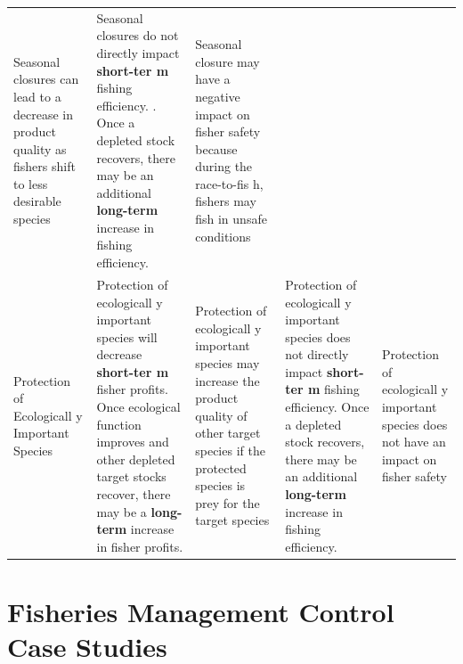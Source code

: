 \documentclass[]{book}
\begin{document}
\begin{longtable}[]{@{}lllll@{}}
\begin{minipage}[t]{0.17\columnwidth}
Seasonal closures can lead to a decrease in product quality as fishers
shift to less desirable species\strut
\end{minipage} & \begin{minipage}[t]{0.17\columnwidth}\raggedright\strut
Seasonal closures do not directly impact \textbf{short-ter m} fishing
efficiency. . Once a depleted stock recovers, there may be an additional
\textbf{long-term } increase in fishing efficiency.\strut
\end{minipage} & \begin{minipage}[t]{0.17\columnwidth}\raggedright\strut
Seasonal closure may have a negative impact on fisher safety because
during the race-to-fis h, fishers may fish in unsafe conditions\strut
\end{minipage}\tabularnewline
\begin{minipage}[t]{0.17\columnwidth}\raggedright\strut
Protection of Ecologicall y Important Species\strut
\end{minipage} & \begin{minipage}[t]{0.17\columnwidth}\raggedright\strut
Protection of ecologicall y important species will decrease
\textbf{short-ter m} fisher profits. Once ecological function improves
and other depleted target stocks recover, there may be a
\textbf{long-term } increase in fisher profits.\strut
\end{minipage} & \begin{minipage}[t]{0.17\columnwidth}\raggedright\strut
Protection of ecologicall y important species may increase the product
quality of other target species if the protected species is prey for the
target species\strut
\end{minipage} & \begin{minipage}[t]{0.17\columnwidth}\raggedright\strut
Protection of ecologicall y important species does not directly impact
\textbf{short-ter m} fishing efficiency. Once a depleted stock recovers,
there may be an additional \textbf{long-term } increase in fishing
efficiency.\strut
\end{minipage} & \begin{minipage}[t]{0.17\columnwidth}\raggedright\strut
Protection of ecologicall y important species does not have an impact on
fisher safety\strut
\end{minipage}\tabularnewline
\bottomrule
\end{longtable}

\section{Fisheries Management Control Case
Studies}\label{fisheries-management-control-case-studies}
\end{document}
